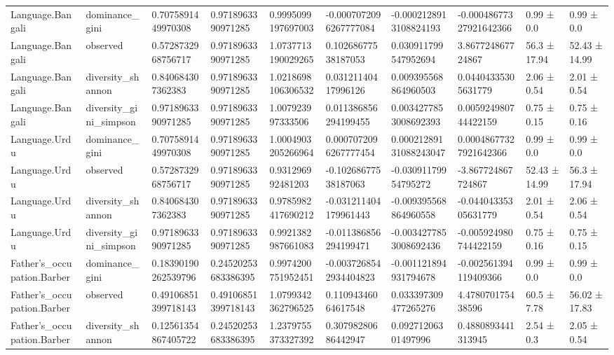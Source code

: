 \begin{longtable}{llllllllll}
Language.Bangali & dominance\_gini & 0.7075891449970308 & 0.9718963390971285 & 0.9995099197697003 & -0.0007072096267777084 & -0.0002128913108824193 & -0.00048677327921642366 & 0.99 ± 0.0 & 0.99 ± 0.0 \\
Language.Bangali & observed & 0.5728732968756717 & 0.9718963390971285 & 1.0737713190029265 & 0.10268677538187053 & 0.030911799547952694 & 3.867724867724867 & 56.3 ± 17.94 & 52.43 ± 14.99 \\
Language.Bangali & diversity\_shannon & 0.840684307362383 & 0.9718963390971285 & 1.0218698106306532 & 0.03121140417996126 & 0.009395568864960503 & 0.04404335305631779 & 2.06 ± 0.54 & 2.01 ± 0.54 \\
Language.Bangali & diversity\_gini\_simpson & 0.9718963390971285 & 0.9718963390971285 & 1.007923997333506 & 0.011386856294199455 & 0.0034277853008692393 & 0.005924980744422159 & 0.75 ± 0.15 & 0.75 ± 0.16 \\
Language.Urdu & dominance\_gini & 0.7075891449970308 & 0.9718963390971285 & 1.0004903205266964 & 0.0007072096267777454 & 0.00021289131088243047 & 0.00048677327921642366 & 0.99 ± 0.0 & 0.99 ± 0.0 \\
Language.Urdu & observed & 0.5728732968756717 & 0.9718963390971285 & 0.931296992481203 & -0.10268677538187063 & -0.03091179954795272 & -3.867724867724867 & 52.43 ± 14.99 & 56.3 ± 17.94 \\
Language.Urdu & diversity\_shannon & 0.840684307362383 & 0.9718963390971285 & 0.9785982417690212 & -0.031211404179961443 & -0.009395568864960558 & -0.04404335305631779 & 2.01 ± 0.54 & 2.06 ± 0.54 \\
Language.Urdu & diversity\_gini\_simpson & 0.9718963390971285 & 0.9718963390971285 & 0.9921382987661083 & -0.011386856294199471 & -0.0034277853008692436 & -0.005924980744422159 & 0.75 ± 0.16 & 0.75 ± 0.15 \\
Father’s\_occupation.Barber & dominance\_gini & 0.18390190262539796 & 0.24520253683386395 & 0.9974200751952451 & -0.0037268542934404823 & -0.001121894931794678 & -0.002561394119409366 & 0.99 ± 0.0 & 0.99 ± 0.0 \\
Father’s\_occupation.Barber & observed & 0.49106851399718143 & 0.49106851399718143 & 1.0799342362796525 & 0.11094346064617548 & 0.033397309477265276 & 4.478070175438596 & 60.5 ± 7.78 & 56.02 ± 17.83 \\
Father’s\_occupation.Barber & diversity\_shannon & 0.12561354867405722 & 0.24520253683386395 & 1.2379755373327392 & 0.30798280686442947 & 0.09271206301497996 & 0.4880893441313945 & 2.54 ± 0.3 & 2.05 ± 0.54 \\

\end{longtable}
